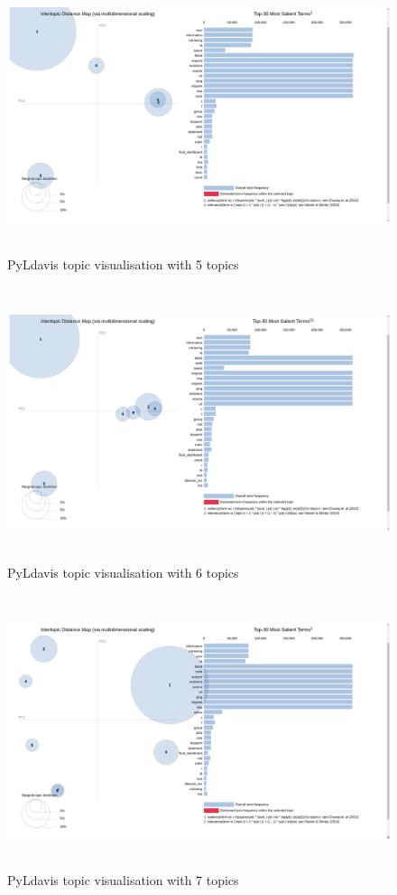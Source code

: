   \begin{figure}[!h]
    \centering
    \includegraphics[width=15cm, height=8cm,trim=0 0 100px 0, clip=true]{figures/pyldavis/pyldavis_5.png}
    \caption{PyLdavis topic visualisation with 5 topics}
    \label{fig:appendices:pyldavis_5}
\end{figure}
 
 \begin{figure}[!h]
    \centering
    \includegraphics[width=15cm, height=8cm,trim=0 0 100px 0, clip=true]{figures/pyldavis/pyldavis_6.png}
    \caption{PyLdavis topic visualisation with 6 topics}
    \label{fig:pyldavis_6}
\end{figure}

 \begin{figure}[!h]
    \centering
    \includegraphics[width=15cm, height=8cm,trim=0 0 100px 0, clip=true]{figures/pyldavis/pyldavis_7.png}
    \caption{PyLdavis topic visualisation with 7 topics}
    \label{fig:pyldavis_7}
\end{figure}

